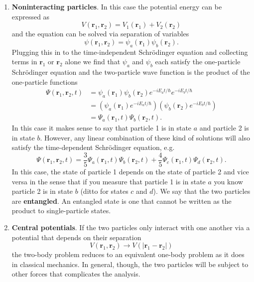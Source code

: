 \documentclass{article}
\renewcommand{\vec}[1]{\boldsymbol{\mathbf{#1}}}
\begin{document}
\begin{itemize}
        \begin{enumerate}
          \item \textbf{Noninteracting particles}. In this case the potential energy can be expressed as \[V(\vec{r}_1, \vec{r}_2) = V_1(\vec{r}_1) + V_2(\vec{r}_2)\] and the equation can be solved via separation of variables \[\psi(\vec{r}_1, \vec{r}_2) = \psi_a(\vec{r}_1) \psi_b(\vec{r}_2).\] Plugging this in to the time-independent Schrödinger equation and collecting terms in $\vec{r}_1$ or $\vec{r}_2$ alone we find that $\psi_a$ and $\psi_b$ each satisfy the one-particle Schrödinger equation and the two-particle wave function is the product of the one-particle functions \begin{align*}
                  \Psi(\vec{r}_1, \vec{r}_2, t) & = \psi_a(\vec{r}_1) \psi_b(\vec{r}_2) e^{-i E_a t / \hbar} e^{-i E_b t / \hbar}                               \\
                                                & = \left( \psi_a(\vec{r}_1) e^{-i E_a t / \hbar} \right) \left( \psi_b(\vec{r}_2) e^{-i E_b t / \hbar} \right) \\
                                                & = \Psi_a(\vec{r}_1, t) \Psi_b(\vec{r}_2, t).
                \end{align*} In this case it makes sense to say that particle 1 is in state $a$ and particle 2 is in state $b$. However, any linear combination of these kind of solutions will also satisfy the time-dependent Schrödinger equation, e.g. \[\Psi(\vec{r}_1, \vec{r}_2 ,t) = \frac{3}{5} \Psi_a(\vec{r}_1, t) \Psi_b(\vec{r}_2, t) + \frac{4}{5} \Psi_c(\vec{r}_1, t) \Psi_d(\vec{r}_2, t).\] In this case, the state of particle 1 depends on the state of particle 2 and vice versa in the sense that if you measure that particle 1 is in state $a$ you know particle 2 is in state $b$ (ditto for states $c$ and $d$). We say that the two particles are \textbf{entangled}. An entangled state is one that cannot be written as the product to single-particle states.

          \item \textbf{Central potentials}. If the two particles only interact with one another via a potential that depends on their separation \[V(\vec{r}_1, \vec{r}_2) \rightarrow V(|\vec{r}_1 - \vec{r}_2|)\] the two-body problem reduces to an equivalent one-body problem as it does in classical mechanics. In general, though, the two particles will be subject to other forces that complicates the analysis.
        \end{enumerate}
\end{itemize}
\end{document}
